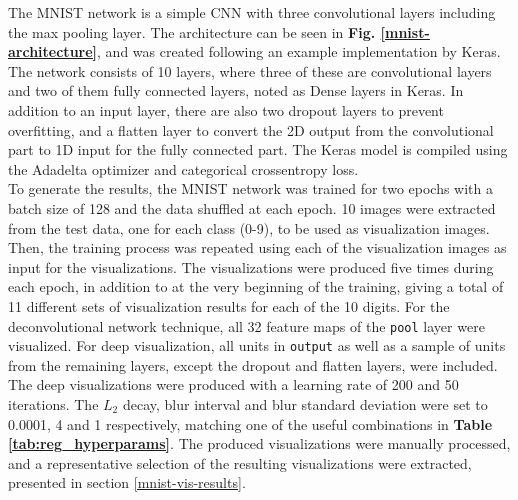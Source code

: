 

The MNIST network is a simple CNN with three convolutional layers including the max pooling layer. The architecture can be seen in \textbf{Fig. \ref{mnist-architecture}}, and was created following an example implementation by Keras. The network consists of 10 layers, where three of these are convolutional layers and two of them fully connected layers, noted as Dense layers in Keras. In addition to an input layer, there are also two dropout layers to prevent overfitting, and a flatten layer to convert the 2D output from the convolutional part to 1D input for the fully connected part. The Keras model is compiled using the Adadelta optimizer and categorical crossentropy loss. \\

\noindent To generate the results, the MNIST network was trained for two epochs with a batch size of 128 and the data shuffled at each epoch. 10 images were extracted from the test data, one for each class (0-9), to be used as visualization images. Then, the training process was repeated using each of the visualization images as input for the visualizations. The visualizations were produced five times during each epoch, in addition to at the very beginning of the training, giving a total of 11 different sets of visualization results for each of the 10 digits. For the deconvolutional network technique, all 32 feature maps of the \texttt{pool} layer were visualized. For deep visualization, all units in \texttt{output} as well as a sample of units from the remaining layers, except the dropout and flatten layers, were included. The deep visualizations were produced with a learning rate of 200 and 50 iterations. The $L_2$ decay, blur interval and blur standard deviation were set to 0.0001, 4 and 1 respectively, matching one of the useful combinations in \textbf{Table \ref{tab:reg_hyperparams}}. The produced visualizations were manually processed, and a representative selection of the resulting visualizations were extracted, presented in section \ref{mnist-vis-results}.

